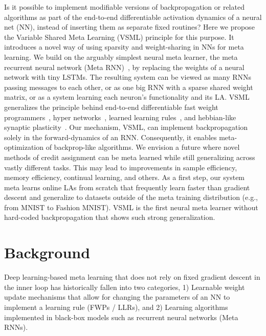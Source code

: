\documentclass{article}
\newcommand{\principle}{VSML}
\newcommand{\principlefull}{Variable Shared Meta Learning}
\newcommand{\fws}{FWPs / LLRs}
\newcommand{\metarnns}{Meta RNNs}
\begin{document}
Is it possible to implement modifiable versions of backpropagation or related algorithms as part of the end-to-end differentiable activation dynamics of a neural net (NN), instead of inserting them as separate fixed routines?
Here we propose the {\principlefull} (\principle) principle for this purpose.
It introduces a novel way of using sparsity and weight-sharing in NNs for meta learning.
We build on the arguably simplest neural meta learner, the meta recurrent neural network (Meta RNN)~\citep{Hochreiter2001,Duan2016,Wang2016}, by replacing the weights of a neural network with tiny LSTMs.
The resulting system can be viewed as many RNNs passing messages to each other, or as one big RNN with a sparse shared weight matrix, or as a system learning each neuron's functionality and its LA.
{\principle} generalizes the principle behind end-to-end differentiable fast weight programmers~\citep{Schmidhuber1992a,Schmidhuber1993a,Ba2016,Schlag}, hyper networks~\citep{Ha2016}, learned learning rules~\citep{Bengio1992OnRule,Gregor2020,Randazzo2020}, and hebbian-like synaptic plasticity~\citep{Schmidhuber:91fastweights,Schmidhuber1993a,Miconi2018DifferentiableBackpropagation,Miconia,Najarro2020}.
Our mechanism, {\principle}, can implement backpropagation solely in the forward-dynamics of an RNN.
Consequently, it enables meta-optimization of backprop-like algorithms.
We envision a future where novel methods of credit assignment can be meta learned while still generalizing across vastly different tasks.
This may lead to improvements in sample efficiency, memory efficiency, continual learning, and others.
As a first step, our system meta learns online LAs from scratch that frequently learn faster than gradient descent and generalize to datasets outside of the meta training distribution (e.g., from MNIST to Fashion MNIST).
{\principle} is the first neural meta learner without hard-coded backpropagation that shows such strong generalization.




\section{Background}\label{sec:background}

Deep learning-based meta learning that does not rely on fixed gradient descent in the inner loop has historically fallen into two categories,
1) Learnable weight update mechanisms that allow for changing the parameters of an NN to implement a learning rule (\fws), and
2) Learning algorithms implemented in black-box models such as recurrent neural networks (\metarnns).
\end{document}
